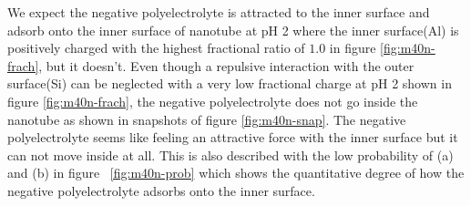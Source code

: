 We expect the negative polyelectrolyte is attracted to the inner surface and adsorb onto the inner surface of nanotube at pH 2 where the inner surface(Al) is positively charged with the highest fractional ratio of $1.0$ in figure \ref{fig:m40n-frach}, but it doesn't. Even though a repulsive interaction with the outer surface(Si) can be neglected with a very low fractional charge at pH 2 shown in figure \ref{fig:m40n-frach}, the negative polyelectrolyte does not go inside the nanotube as shown in snapshots of figure \ref{fig:m40n-snap}. The negative polyelectrolyte seems like feeling an attractive force with the inner surface but it can not move inside at all. This is also described with the low probability of (a) and (b) in figure ~\ref{fig:m40n-prob} which shows the quantitative degree of how the negative polyelectrolyte adsorbs onto the inner surface. 

